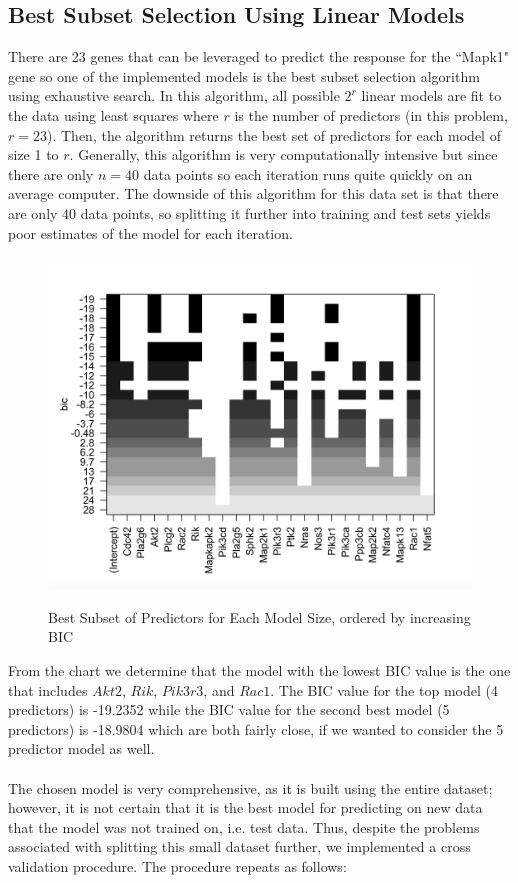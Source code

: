 \documentclass{article}
\begin{document}
\subsection{Best Subset Selection Using Linear Models}
There are 23 genes that can be leveraged to predict the response for the ``Mapk1" gene so one of the implemented models is the best subset selection algorithm using exhaustive search.  In this algorithm, all possible $2^r$ linear models are fit to the data using least squares where $r$ is the number of predictors (in this problem, $r=23$).  Then, the algorithm returns the best set of predictors for each model of size 1 to $r$.  Generally, this algorithm is very computationally intensive but since there are only $n=40$ data points so each iteration runs quite quickly on an average computer.  The downside of this algorithm for this data set is that there are only 40 data points, so splitting it further into training and test sets yields poor estimates of the model for each iteration. 
\begin{figure}[H]
	\caption{Best Subset of Predictors for Each Model Size, ordered by increasing BIC}
	\includegraphics[scale=0.60]{best_subsets}
	\centering
	\label{fig:best_subsets}
\end{figure}
From the chart we determine that the model with the lowest BIC value is the one that includes $Akt2$, $Rik$, $Pik3r3$, and $Rac1$.  The BIC value for the top model (4 predictors) is  -19.2352 while the BIC value for the second best model (5 predictors) is -18.9804 which are both fairly close, if we wanted to consider the 5 predictor model as well.\\
\null\\
The chosen model is very comprehensive, as it is built using the entire dataset; however, it is not certain that it is the best model for predicting on new data that the model was not trained on, i.e. test data.  Thus, despite the problems associated with splitting this small dataset further, we implemented a cross validation procedure. The procedure repeats as follows:
\end{document}
